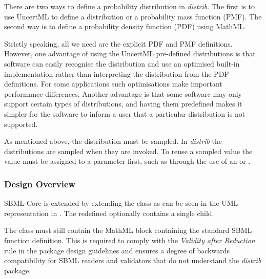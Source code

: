 \documentclass[draftspec]{sbmlpkgspec}
\newcommand{\distribshort}{\emph{distrib}\xspace}
\newcommand{\mathml}{MathML\xspace}
\begin{document}
There are two ways to define a probability distribution in
\distribshort. The first is to use UncertML to define a distribution
or a probability mass function (PMF).  The second way is to define
a probability density function (PDF) using MathML.

Strictly speaking, all we need are the explicit PDF and PMF
definitions. However, one advantage of using the UncertML pre-defined
distributions is that software can easily recognise the distribution
and use an optimised built-in implementation rather than interpreting
the distribution from the PDF definitions. For some
applications such optimisations make important performance
differences.  Another advantage is that some software may only support certain types of distributions, and having them predefined makes it simpler for the software to inform a user that a particular distribution is not supported.

As mentioned above, the distribution must be sampled. In \distribshort
the distributions are sampled when they are invoked. To reuse a
sampled value the value must be assigned to a parameter first, such as through the use of an \InitialAssignment or \EventAssignment.

\subsubsection{Design Overview}

SBML Core is extended by extending the \FunctionDefinition class as
can be seen in the UML representation in . The redefined \FunctionDefinition optionally
contains a single  child.

The \FunctionDefinition class must still contain the
\mathml block containing the standard SBML function definition. This is
required to comply with the \emph{Validity after Reduction} rule in the
package design guidelines \cite{sbmll3v1packrule} and ensures a degree
of backwards compatibility for SBML readers and validators that do not
understand the \distribshort package.
\end{document}
